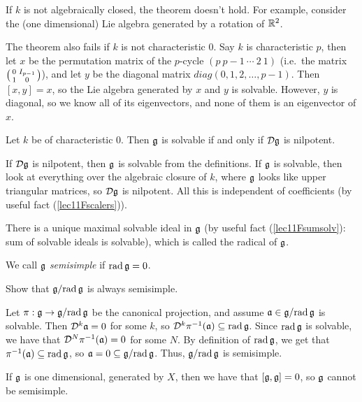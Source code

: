  \begin{remark}
   If $k$ is not algebraically closed, the theorem doesn't hold. For example, consider
   the (one dimensional) Lie algebra generated by a rotation of $\mathbb{R}^2$.

   The theorem also fails if $k$ is not characteristic 0. Say $k$ is characteristic
   $p$, then let
   $x$ be the permutation matrix of the $p$-cycle $(p\ p-1\ \cdots \ 2\ 1)$ (i.e.\ the
   matrix $\left( \begin{smallmatrix} 0 & I_{p-1} \\ 1 & 0 \end{smallmatrix} \right)$), and let $y$ be the diagonal matrix
   $diag(0,1,2,\dots, p-1)$. Then $[x,y]=x$, so the Lie algebra generated by $x$ and
   $y$ is solvable. However, $y$ is diagonal, so we know all of its eigenvectors, and
   none of them is an eigenvector of $x$.
 \end{remark}

 \begin{corollary}
   Let $k$ be of characteristic 0. Then $\mathfrak{g}$ is solvable if and only if $\mathcal{D}\mathfrak{g}$ is
   nilpotent.
 \end{corollary}
 If $\mathcal{D}\mathfrak{g}$ is nilpotent, then $\mathfrak{g}$ is solvable from the definitions. If $\mathfrak{g}$ is
 solvable, then look at everything over the algebraic closure of $k$, where $\mathfrak{g}$ looks
 like upper triangular matrices, so $\mathcal{D}\mathfrak{g}$ is nilpotent. All this is independent of
 coefficients (by useful fact (\ref{lec11Fscalers})).


 There is a unique maximal solvable ideal in $\mathfrak{g}$ (by useful fact
(\ref{lec11Fsumsolv}): sum of solvable ideals is solvable), which is called the
radical of $\mathfrak{g}$.
 \begin{definition}\label{lec11def:semisimple}
   We call $\mathfrak{g}$ \emph{semisimple} if $\mathrm{rad}\,\mathfrak{g}=0$.
 \end{definition}
 \begin{exercise}
   Show that $\mathfrak{g}/\mathrm{rad}\,\mathfrak{g}$ is always semisimple.
   \begin{solution}
     Let $\pi:\mathfrak{g}\to \mathfrak{g}/\mathrm{rad}\,\mathfrak{g}$ be the canonical projection, and assume
     $\mathfrak{a}\in \mathfrak{g}/\mathrm{rad}\,\mathfrak{g}$ is solvable. Then $\mathcal{D}^k \mathfrak{a}=0$ for some $k$, so $\mathcal{D}^k
     \pi^{-1}(\mathfrak{a})\subseteq \mathrm{rad}\,\mathfrak{g}$. Since $\mathrm{rad}\,\mathfrak{g}$ is solvable, we
     have that $\mathcal{D}^N \pi^{-1}(\mathfrak{a})=0$ for some $N$. By definition of
     $\mathrm{rad}\,\mathfrak{g}$, we get that $\pi^{-1}(\mathfrak{a})\subseteq \mathrm{rad}\,\mathfrak{g}$, so
     $\mathfrak{a}=0\subseteq \mathfrak{g}/\mathrm{rad}\,\mathfrak{g}$. Thus, $\mathfrak{g}/\mathrm{rad}\,\mathfrak{g}$ is semisimple.
   \end{solution}
 \end{exercise}
 If $\mathfrak{g}$ is one dimensional, generated by $X$, then we have that $[\mathfrak{g},\mathfrak{g}]=0$, so $\mathfrak{g}$
 cannot be semisimple.

